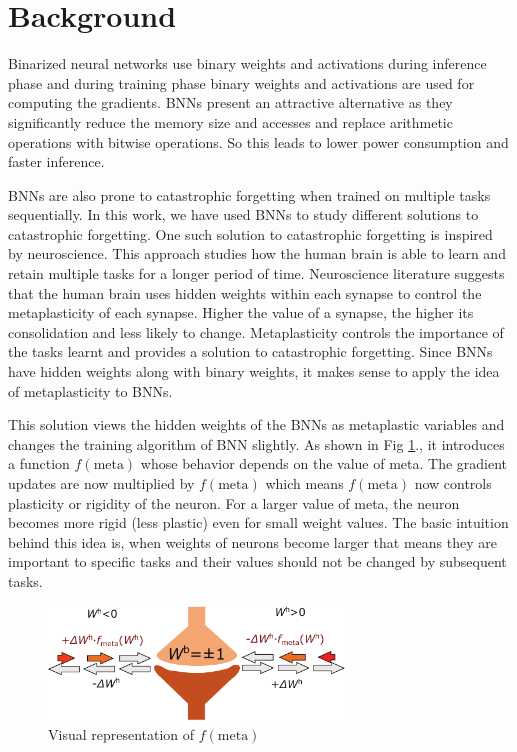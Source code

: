 \documentclass[manuscript,screen,review]{acmart}
\begin{document}
\section{Background}
Binarized neural networks use binary weights and activations during inference phase and during training phase binary weights and activations are used for computing the gradients. BNNs present an attractive alternative as they significantly reduce the memory size and accesses and replace arithmetic operations with bitwise operations. So this leads to lower power consumption and faster inference. 

BNNs are also prone to catastrophic forgetting when trained on multiple tasks sequentially. In this work, we have used BNNs to study different solutions to catastrophic forgetting. One such solution to catastrophic forgetting is inspired by neuroscience. This approach studies how the human brain is able to learn and retain multiple tasks for a longer period of time. Neuroscience literature suggests that the human brain uses hidden weights within each synapse to control the metaplasticity of each synapse. Higher the value of a synapse, the higher its consolidation and less likely to change. Metaplasticity controls the importance of the tasks learnt and provides a solution to catastrophic forgetting. Since BNNs have hidden weights along with binary weights, it makes sense to apply the idea of metaplasticity to BNNs. 

This solution views the hidden weights of the BNNs as metaplastic variables and changes the training algorithm of BNN slightly. As shown in Fig \ref{fig:fig1}., it introduces a function \(f(\text{meta})\) whose behavior depends on the value of meta. The gradient updates are now multiplied by \(f(\text{meta})\) which means \(f(\text{meta})\) now controls plasticity or rigidity of the neuron. For a larger value of meta, the neuron becomes more rigid (less plastic) even for small weight values. The basic intuition behind this idea is, when weights of neurons become larger that means they are important to specific tasks and their values should not be changed by subsequent tasks. 

\begin{figure}[ht]
    \centering
    \includegraphics[width=0.7\textwidth]{figures/report/Fig1.pdf}
    \caption{Visual representation of \(f(\text{meta})\)}
    \label{fig:fig1}
\end{figure}
\end{document}
